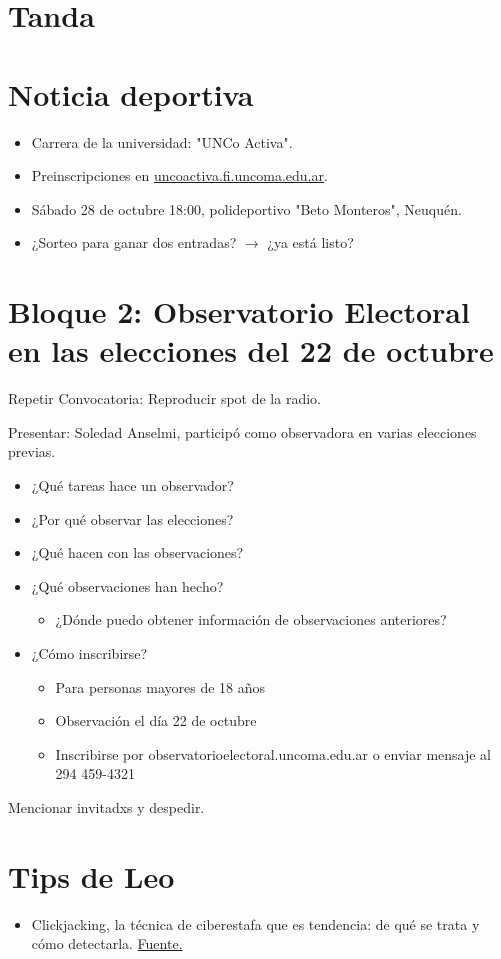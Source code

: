 \documentclass[11pt]{article}
\begin{document}
\section{ Tanda}
\label{sec:org593e9fe}
\section{Noticia deportiva}
\label{sec:orgd9918fe}
\begin{itemize}
\item Carrera de la universidad: "UNCo Activa".
\item Preinscripciones en \href{https://uncoactiva.fi.uncoma.edu.ar}{uncoactiva.fi.uncoma.edu.ar}.
\item Sábado 28 de octubre 18:00, polideportivo "Beto Monteros", Neuquén.
\item ¿Sorteo para ganar dos entradas? \(\to\) ¿ya está listo?
\end{itemize}
\section{Bloque 2: Observatorio Electoral en las elecciones del 22 de octubre}
\label{sec:org42e1ace}
 Repetir Convocatoria: Reproducir spot de la radio.

Presentar: Soledad Anselmi, participó como observadora en varias elecciones previas.

\begin{itemize}
\item ¿Qué tareas hace un observador?
\item ¿Por qué observar las elecciones?
\item ¿Qué hacen con las observaciones?
\item ¿Qué observaciones han hecho?
\begin{itemize}
\item ¿Dónde puedo obtener información de observaciones anteriores?
\end{itemize}
\item ¿Cómo inscribirse?
\begin{itemize}
\item Para personas mayores de 18 años
\item Observación el día 22 de octubre
\item Inscribirse por observatorioelectoral.uncoma.edu.ar o enviar mensaje al 294 459-4321
\end{itemize}
\end{itemize}

Mencionar invitadxs y despedir.

\section{Tips de Leo}
\label{sec:org648bd5d}
\begin{itemize}
\item Clickjacking, la técnica de ciberestafa que es tendencia: de qué se trata y cómo detectarla. \href{https://tn.com.ar/tecno/novedades/2023/09/22/clickjacking-la-tecnica-de-ciberestafa-que-te-hace-hacer-en-internet-cosas-que-no-queres/}{Fuente.}
\end{itemize}
\end{document}
